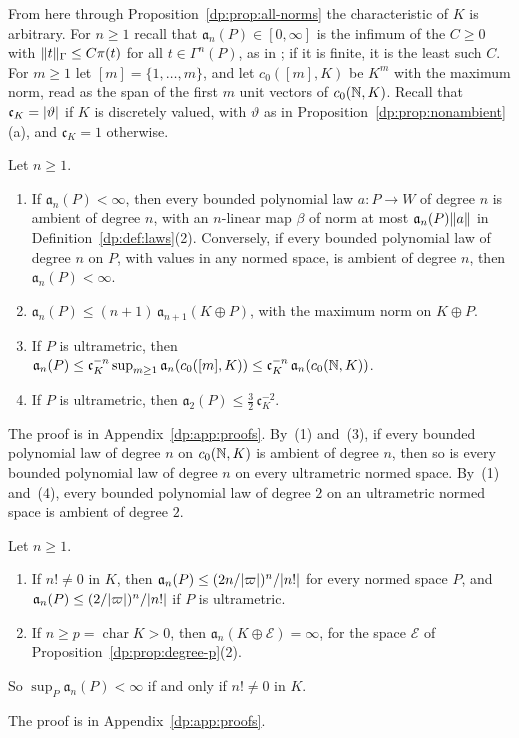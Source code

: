 From here through Proposition~\ref{dp:prop:all-norms} the characteristic of $K$ is arbitrary. For $n\ge1$ recall that $\mathfrak a_n(P)\in[0,\infty]$ is the infimum of the $C\ge0$ with $\lVert t\rVert_\Gamma\le C\pi(t)$ for all $t\in\Gamma^n(P)$, as in \cite[Definition~14.36]{I}; if it is finite, it is the least such $C$. For $m\ge1$ let $[m]=\{1,\dots,m\}$, and let $c_0([m],K)$ be $K^m$ with the maximum norm, read as the span of the first $m$ unit vectors of $c_0(\mathbb N,K)$. Recall that $\mathfrak c_K=\lvert \vartheta\rvert$ if $K$ is discretely valued, with $\vartheta$ as in Proposition~\ref{dp:prop:nonambient}(a), and $\mathfrak c_K=1$ otherwise.

\begin{proposition}\label{dp:prop:ultrametric}
Let $n\ge1$.
\begin{enumerate}
\item If $\mathfrak a_n(P)<\infty$, then every bounded polynomial law $a\colon P\to W$ of degree $n$ is ambient of degree $n$, with an $n$\nobreakdash-linear map $\beta$ of norm at most $\mathfrak a_n(P)\lVert a\rVert$ in Definition~\ref{dp:def:laws}(2). Conversely, if every bounded polynomial law of degree $n$ on $P$, with values in any normed space, is ambient of degree $n$, then $\mathfrak a_n(P)<\infty$.
\item $\mathfrak a_n(P)\le(n+1)\,\mathfrak a_{n+1}(K\oplus P)$, with the maximum norm on $K\oplus P$.
\item If $P$ is ultrametric, then $\mathfrak a_n(P)\le\mathfrak c_K^{-n}\sup_{m\ge1}\mathfrak a_n(c_0([m],K))\le\mathfrak c_K^{-n}\,\mathfrak a_n(c_0(\mathbb N,K))$.
\item If $P$ is ultrametric, then $\mathfrak a_2(P)\le\frac32\,\mathfrak c_K^{-2}$.
\end{enumerate}
\end{proposition}
The proof is in Appendix~\ref{dp:app:proofs}. By~(1) and~(3), if every bounded polynomial law of degree $n$ on $c_0(\mathbb N,K)$ is ambient of degree $n$, then so is every bounded polynomial law of degree $n$ on every ultrametric normed space. By~(1) and~(4), every bounded polynomial law of degree $2$ on an ultrametric normed space is ambient of degree $2$.

\begin{proposition}\label{dp:prop:all-norms}
Let $n\ge1$.
\begin{enumerate}
\item If $n!\ne0$ in $K$, then $\mathfrak a_n(P)\le(2n/\lvert \varpi\rvert)^n/\lvert n!\rvert$ for every normed space $P$, and $\mathfrak a_n(P)\le(2/\lvert \varpi\rvert)^n/\lvert n!\rvert$ if $P$ is ultrametric.
\item If $n\ge p=\operatorname{char}K>0$, then $\mathfrak a_n(K\oplus\mathcal E)=\infty$, for the space $\mathcal E$ of Proposition~\ref{dp:prop:degree-p}(2).
\end{enumerate}
So $\sup_P\mathfrak a_n(P)<\infty$ if and only if $n!\ne0$ in $K$.
\end{proposition}
The proof is in Appendix~\ref{dp:app:proofs}.

